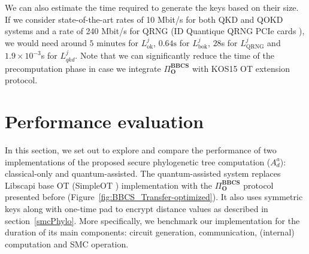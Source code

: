 We can also estimate the time required to generate the keys based on their size. If we consider state-of-the-art rates of 10 Mbit/s for both QKD and QOKD systems \cite{YPT18} and a rate of 240 Mbit/s for QRNG (ID Quantique QRNG PCIe cards \cite{IDQ}), we would need around $5\text{ minutes}$ for $L^j_{\text{ok}}$, $0.64\text{s}$ for $L^j_{\text{bok}}$, $28$s for $L^j_{\text{QRNG}}$ and $1.9\times 10^{-3}$s for $L^{j}_{qkd}$. Note that we can significantly reduce the time of the precomputation phase in case we integrate $\Pi^{\textbf{BBCS}}_{\textbf{O}}$ with KOS15 OT extension protocol. 

%



\section{Performance evaluation}\label{perfEvaluation}

In this section, we set out to explore and compare the performance of two implementations of the proposed secure phylogenetic tree computation ($A^a_d$): classical-only and quantum-assisted. The quantum-assisted system replaces Libscapi base OT (SimpleOT \cite{C15}) implementation with the $\Pi^{\textbf{BBCS}}_{\textbf{O}}$ protocol presented before (Figure~\ref{fig:BBCS_Transfer-optimized}). It also uses symmetric keys along with one-time pad to encrypt distance values as described in section~\ref{smcPhylo}. More specifically, we benchmark our implementation for the duration of its main components: circuit generation, communication, (internal) computation and SMC operation.

